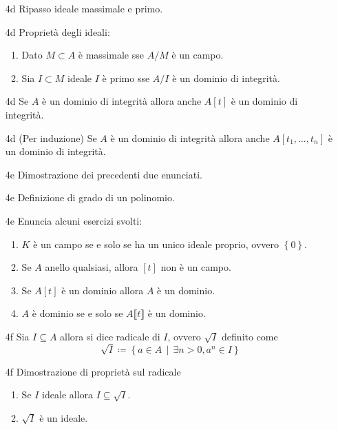 \documentclass[italian]{article}
\begin{document}
    \begin{enumerate}
      \item[4d] Ripasso ideale massimale e primo.
      \item[4d] Proprietà degli ideali:
        \begin{enumerate}
          \item Dato $M \subset A$ è massimale sse $A / M$ è un campo.
          \item Sia $I \subset M$ ideale $I$ è primo sse $A / I$ è un dominio di
            integrità.
        \end{enumerate}
      \item[4d] Se $A$ è un dominio di integrità allora anche $A\left[t\right]$
        è un dominio di integrità.
      \item[4d] (Per induzione) Se $A$ è un dominio di integrità allora anche $A\left[t_1,
        \dots,t_n\right]$ è un dominio di integrità.
      \item[4e] Dimostrazione dei precedenti due enunciati.
      \item[4e] Definizione di grado di un polinomio.
      \item[4e] Enuncia alcuni esercizi svolti:
        \begin{enumerate}
          \item $K$ è un campo se e solo se ha un unico ideale proprio, ovvero
            $\left\{ 0 \right\}$.
          \item Se $A$ anello qualsiasi, allora $\left[t\right]$ non è un campo.
          \item Se $A\left[t\right]$ è un dominio allora $A$ è un dominio.
          \item $A$ è dominio se e solo se $A\llbracket t \rrbracket$ è un dominio.
        \end{enumerate}
      \item[4f] Sia $I \subseteq A$ allora si dice radicale di $I$, ovvero
        $\sqrt{I}$ definito come
            \begin{equation*}
              \sqrt{I} \coloneqq \left\{ a \in A \,\middle|\, \exists n > 0,
                a^n \in
              I\right\}
            \end{equation*}
      \item[4f] Dimostrazione di proprietà sul radicale
        \begin{enumerate}
          \item Se $I$ ideale allora $I \subseteq \sqrt{I}$.
          \item $\sqrt{I}$ è un ideale.

\end{enumerate}
\end{enumerate}
\end{document}
